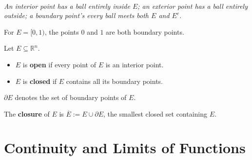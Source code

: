 \documentclass[11pt]{report}
\newcommand{\figcap}[1]{\\[1.5mm]\parbox{0.92\textwidth}{\small\itshape #1}}
\newcommand{\R}{\mathbb{R}}
\begin{document}
\begin{center}
%
\figcap{An interior point has a ball entirely inside $E$; an exterior point has a ball entirely outside; a boundary point's every ball meets both $E$ and $E^c$.}
\end{center}

\begin{example}
For $E = [0, 1)$, the points $0$ and $1$ are both boundary points.
\end{example}

\begin{definition}
Let $E \subseteq \R^n$.
\begin{itemize}[itemsep=4pt]
    \item $E$ is \textbf{open} if every point of $E$ is an interior point.
    \item $E$ is \textbf{closed} if $E$ contains all its boundary points.
\end{itemize}
\end{definition}

\begin{notation}
$\partial E$ denotes the set of boundary points of $E$.
\end{notation}

\begin{definition}[Closure]
The \textbf{closure} of $E$ is $\overline{E} := E \cup \partial E$, the smallest closed set containing $E$.
\end{definition}

\section{Continuity and Limits of Functions}
\end{document}
